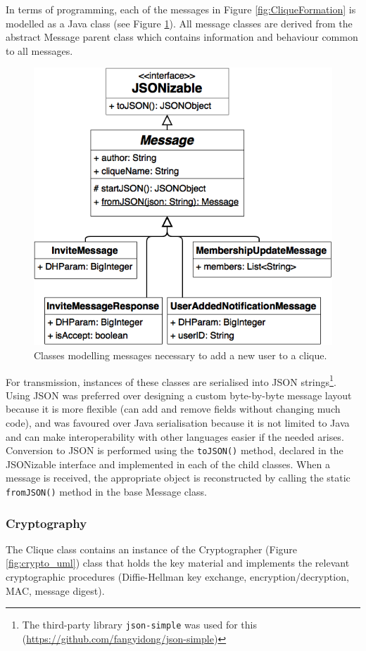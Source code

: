 \documentclass[a4paper, 12pt]{report}
\begin{document}
In terms of programming, each of the messages in Figure \ref{fig:CliqueFormation} is modelled as a Java class (see Figure \ref{fig:messages_uml}). All message classes are derived from the abstract Message parent class which contains information and behaviour common to all messages.

\begin{figure}[H]
    \centering
    \includegraphics[width=0.6\linewidth]{pics/messages_uml.png}
    \caption{\label{fig:messages_uml} Classes modelling messages necessary to add a new user to a clique.}
\end{figure}

For transmission, instances of these classes are serialised into JSON strings\footnote{The third-party library \texttt{json-simple} was used for this (\url{https://github.com/fangyidong/json-simple})}. Using JSON was preferred over designing a custom byte-by-byte message layout because it is more flexible (can add and remove fields without changing much code), and was favoured over Java serialisation because it is not limited to Java and can make interoperability with other languages easier if the needed arises. Conversion to JSON is performed using the \texttt{toJSON()} method, declared in the JSONizable interface and implemented in each of the child classes. When a message is received, the appropriate object is reconstructed by calling the static \texttt{fromJSON()} method in the base Message class. \\

\subsubsection{Cryptography}
The Clique class contains an instance of the Cryptographer (Figure \ref{fig:crypto_uml}) class that holds the key material and implements the relevant cryptographic procedures (Diffie-Hellman key exchange, encryption/decryption, MAC, message digest).
\end{document}
